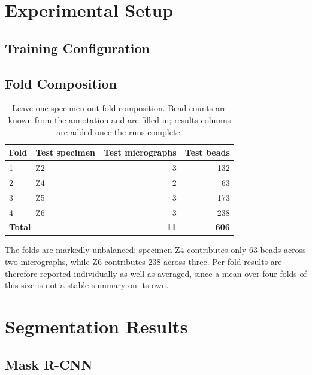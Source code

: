 \section{Experimental Setup}


\subsection{Training Configuration}

\subsection{Fold Composition}

\begin{table}[htbp]
    \centering
    \caption{Leave-one-specimen-out fold composition. Bead counts are known from the
    annotation and are filled in; results columns are added once the runs complete.}
    \label{tab:folds}
    \begin{tabular}{llrr}
        \toprule
        Fold & Test specimen & Test micrographs & Test beads \\
        \midrule
        1 & Z2 & 3 & 132 \\
        2 & Z4 & 2 & 63  \\
        3 & Z5 & 3 & 173 \\
        4 & Z6 & 3 & 238 \\
        \midrule
        \multicolumn{2}{l}{\textbf{Total}} & \textbf{11} & \textbf{606} \\
        \bottomrule
    \end{tabular}
\end{table}

The folds are markedly unbalanced: specimen Z4 contributes only 63 beads across two
micrographs, while Z6 contributes 238 across three. Per-fold results are therefore
reported individually as well as averaged, since a mean over four folds of this
size is not a stable summary on its own.

\section{Segmentation Results}

\subsection{Mask R-CNN}

